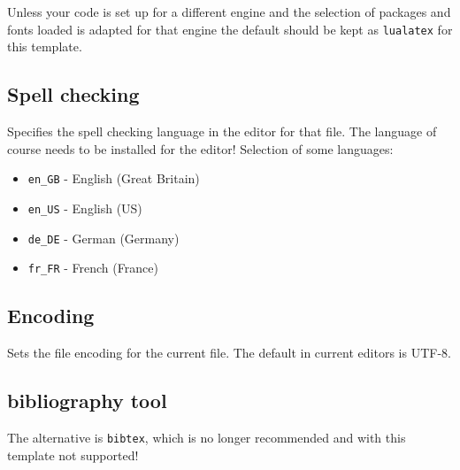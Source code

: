 Unless your code is set up for a different engine and the selection of packages and fonts loaded is adapted for that engine the default should be kept as \texttt{lualatex} for this template. 

\subsection{Spell checking}
\label{sec:doc:magiccomments:spell}

\begin{latexcode}
\end{latexcode}
%
Specifies the spell checking language in the editor for that file. 
The language of course needs to be installed for the editor!
%
Selection of some languages:
\begin{itemize}[noitemsep]
\item \texttt{en\_GB} - English (Great Britain)
\item \texttt{en\_US} - English (US)
\item \texttt{de\_DE} - German (Germany)
\item \texttt{fr\_FR} - French (France)
\end{itemize}

\subsection{Encoding}
\label{sec:doc:magiccomments:encoding}

\begin{latexcode}
\end{latexcode}
%
Sets the file encoding for the current file. The default in current editors is UTF-8.

\subsection{bibliography tool}
\label{sec:doc:magiccomments:bib}

\begin{latexcode}
\end{latexcode}
%
The alternative is \texttt{bibtex}, which is no longer recommended and with this template
not supported! 

